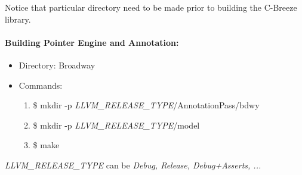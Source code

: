Notice that particular directory need to be made prior to building the C-Breeze library.

\paragraph{\bf Building Pointer Engine and Annotation:}
\begin{itemize}\itemsep.5pt
\item Directory: Broadway
\item Commands: 
\begin{enumerate}\itemsep.5pt
\item \$ mkdir -p \textit{LLVM\_RELEASE\_TYPE}/AnnotationPass/bdwy
\item \$ mkdir -p \textit{LLVM\_RELEASE\_TYPE}/model
\item \$ make
\end{enumerate}
\end{itemize}

\textit{LLVM\_RELEASE\_TYPE} can be \textit{Debug, Release, Debug+Asserts, ...}



